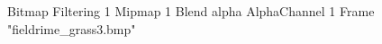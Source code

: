 {Bitmap
	{Filtering 1}
	{Mipmap 1}
	{Blend alpha}
	{AlphaChannel 1}
	{Frame "fieldrime_grass3.bmp"}
}
